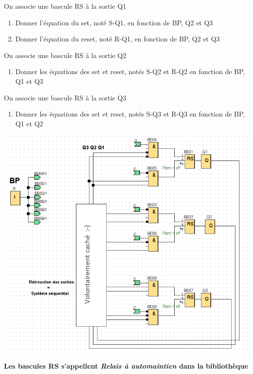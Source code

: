 \documentclass[11pt]{article}
\begin{document}
\begin{UPSTIactivite}

    \UPSTIquestion{}

    On associe une bascule RS à la sortie Q1

    \begin{enumerate}
        \item Donner l’équation du set, noté S-Q1, en fonction de BP, Q2 et Q3
        \item Donner l’équation du reset, noté R-Q1, en fonction de BP, Q2 et Q3
    \end{enumerate}

    On associe une bascule RS à la sortie Q2
    \begin{enumerate}[resume]
        \item  Donner les équations des set et reset, notés S-Q2 et
        R-Q2 en fonction de BP, Q1 et Q3        
    \end{enumerate}

    On associe une bascule RS à la sortie Q3
    \begin{enumerate}[resume]
        \item Donner les équations des set et reset, notés S-Q3 et
        R-Q3 en fonction de BP, Q1 et Q2        
    \end{enumerate}
\end{UPSTIactivite}
\pagebreak
\begin{UPSTIactivite}
    \begin{center}
        \includegraphics[width=.5\textwidth]{images/rs-activite2.png}
    \end{center}
    \textbf{Les bascules RS s'appellent \textit{Relais à automaintien} dans la bibliothèque}
\end{UPSTIactivite}
\end{document}
